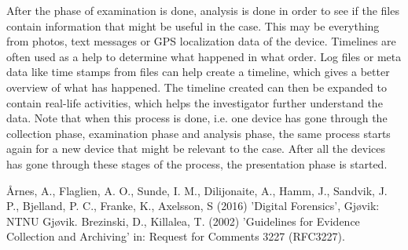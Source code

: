 After the phase of examination is done, analysis is done in order to see if the files contain information that might be useful in the case. This may be everything from photos, text messages or GPS localization data of the device. Timelines are often used as a help to determine what happened in what order. Log files or meta data like time stamps from files can help create a timeline, which gives a better overview of what has happened. The timeline created can then be expanded to contain real-life activities, which helps the investigator further understand the data. Note that when this process is done, i.e. one device has gone through the collection phase, examination phase and analysis phase, the same process starts again for a new device that might be relevant to the case. After all the devices has gone through these stages of the process, the presentation phase is started.

Årnes, A., Flaglien, A. O., Sunde, I. M., Dilijonaite, A., Hamm, J., Sandvik, J. P., Bjelland, P. C., Franke, K., Axelsson, S (2016) 'Digital Forensics', Gjøvik: NTNU Gjøvik.
Brezinski, D., Killalea, T. (2002) 'Guidelines for Evidence Collection and Archiving' in: Request for Comments 3227 (RFC3227).

